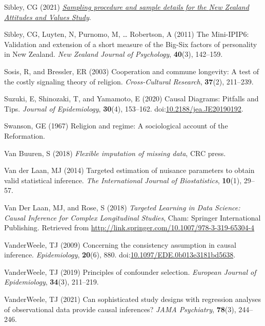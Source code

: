 \documentclass[
  single column]{article}
\newlength{\cslhangindent}
\newenvironment{CSLReferences}[2] %
 {\begin{list}{}{%
  \setlength{\itemindent}{0pt}
  \setlength{\leftmargin}{0pt}
  \setlength{\parsep}{0pt}
  \ifodd #1
   \setlength{\leftmargin}{\cslhangindent}
   \setlength{\itemindent}{-1\cslhangindent}
  \fi
  \setlength{\itemsep}{#2\baselineskip}}}
 {\end{list}}
\begin{document}
\begin{CSLReferences}{1}{0}
Sibley, CG (2021)
\emph{\href{https://doi.org/10.31234/osf.io/wgqvy}{Sampling procedure
and sample details for the {N}ew {Z}ealand {A}ttitudes and {V}alues
{S}tudy}}.

Sibley, CG, Luyten, N, Purnomo, M, \ldots{} Robertson, A (2011) The
Mini-IPIP6: Validation and extension of a short measure of the Big-Six
factors of personality in {N}ew {Z}ealand. \emph{New Zealand Journal of
Psychology}, \textbf{40}(3), 142--159.

Sosis, R, and Bressler, ER (2003) Cooperation and commune longevity: A
test of the costly signaling theory of religion. \emph{Cross-Cultural
Research}, \textbf{37}(2), 211--239.

Suzuki, E, Shinozaki, T, and Yamamoto, E (2020) Causal Diagrams:
Pitfalls and Tips. \emph{Journal of Epidemiology}, \textbf{30}(4),
153--162.
doi:\href{https://doi.org/10.2188/jea.JE20190192}{10.2188/jea.JE20190192}.

Swanson, GE (1967) Religion and regime: A sociological account of the
{R}eformation.

Van Buuren, S (2018) \emph{Flexible imputation of missing data}, CRC
press.

Van der Laan, MJ (2014) Targeted estimation of nuisance parameters to
obtain valid statistical inference. \emph{The International Journal of
Biostatistics}, \textbf{10}(1), 29--57.

Van Der Laan, MJ, and Rose, S (2018) \emph{Targeted Learning in Data
Science: Causal Inference for Complex Longitudinal Studies}, Cham:
Springer International Publishing. Retrieved from
\url{http://link.springer.com/10.1007/978-3-319-65304-4}

VanderWeele, TJ (2009) Concerning the consistency assumption in causal
inference. \emph{Epidemiology}, \textbf{20}(6), 880.
doi:\href{https://doi.org/10.1097/EDE.0b013e3181bd5638}{10.1097/EDE.0b013e3181bd5638}.

VanderWeele, TJ (2019) Principles of confounder selection.
\emph{European Journal of Epidemiology}, \textbf{34}(3), 211--219.

VanderWeele, TJ (2021) Can sophisticated study designs with regression
analyses of observational data provide causal inferences? \emph{JAMA
Psychiatry}, \textbf{78}(3), 244--246.


\end{CSLReferences}
\end{document}
